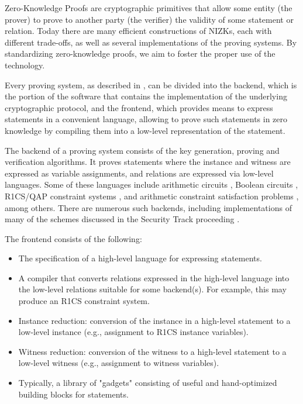 \documentclass[a4paper,12pt]{article}
\begin{document}
Zero-Knowledge Proofs \cite{GMR85zk} are cryptographic primitives that allow some entity (the prover) to prove to another party (the verifier) the validity of some statement or relation. Today there are many efficient constructions of NIZKs, each with different trade-offs, as well as several implementations of the proving systems. By standardizing zero-knowledge proofs, we aim to foster the proper use of the technology.

Every proving system, as described in \cite{ZKProofImplementation}, can be divided into the backend, which is the portion of the software that contains the implementation of the underlying cryptographic protocol, and the frontend, which provides means to express statements in a convenient language, allowing to prove such statements in zero knowledge by compiling them into a low-level representation of the statement.

The backend of a proving system consists of the key generation, proving and verification algorithms. It proves statements where the instance and witness are expressed as variable assignments, and relations are expressed via low-level languages. Some of these languages include arithmetic circuits \cite{GKR08,wahby2018doubly,cryptoeprint:2018:280,mallersonic}, Boolean circuits \cite{giacomelli2016zkboo,chase2017post,ames2017ligero}, R1CS/QAP constraint systems \cite{GGPR13qsp,PHGR13pinocchio,BCGTV13csnark-eprint,BCTV13von,Groth16size,ben2018aurora, kosba2015c,wu2018dizk,bunz2018bulletproofs}, and arithmetic constraint satisfaction problems \cite{ben2013fast,ben2018scalable}, among others. There are numerous such backends, including implementations of many of the schemes discussed in the Security Track proceeding \cite{ZKProofSecurity}.

The frontend consists of the following:
\begin{itemize}
	\item The specification of a high-level language for expressing statements.
	\item A compiler that converts relations expressed in the high-level language into the low-level relations suitable for some backend(s). For example, this may produce an R1CS constraint system.
	\item Instance reduction: conversion of the instance in a high-level statement to a low-level instance (e.g., assignment to R1CS instance variables).
	\item Witness reduction: conversion of the witness to a high-level statement to a low-level witness (e.g., assignment to witness variables).
	\item Typically, a library of "gadgets" consisting of useful and hand-optimized building blocks for statements.
\end{itemize}
\end{document}
